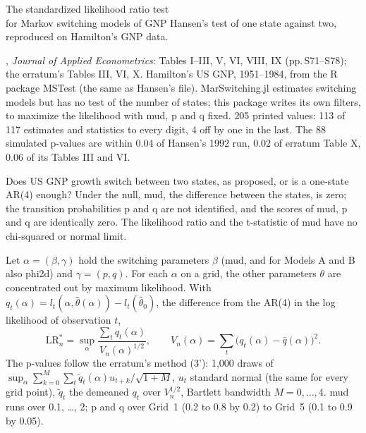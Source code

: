 
\renewcommand{\vignetteauthor}{Antonio Saragga Seabra}
\renewcommand{\vignettedate}{6 November 2026}
\renewcommand{\vignettelicense}{MIT}



  {The standardized likelihood ratio test\\ for Markov switching models of GNP}
  {Hansen's test of one state against two, reproduced on Hamilton's GNP data.}

\factsheet
  {, \emph{Journal of Applied Econometrics}: Tables I--III, V, VI, VIII, IX (pp.\,S71--S78); the  erratum's Tables III, VI, X. Hamilton's US GNP, 1951--1984, from the R package MSTest (the same as Hansen's file).}
  {MarSwitching.jl estimates switching models but has no test of the number of states; this package writes its own filters, to maximize the likelihood with mud, p and q fixed.}
  {}
  {205 printed values: 113 of 117 estimates and statistics to every digit, 4 off by one in the last. The 88 simulated p-values are within 0.04 of Hansen's 1992 run, 0.02 of erratum Table X, 0.06 of its Tables III and VI.}

Does US GNP growth switch between two states, as  proposed, or is a one-state AR(4) enough? Under the null, mud, the difference between the states, is zero; the transition probabilities p and q are not identified, and the scores of mud, p and q are identically zero. The likelihood ratio and the t-statistic of mud have no chi-squared or normal limit.

Let $\alpha=(\beta,\gamma)$ hold the switching parameters $\beta$ (mud, and for Models A and B also phi2d) and $\gamma=(p,q)$. For each $\alpha$ on a grid, the other parameters $\theta$ are concentrated out by maximum likelihood. With $q_t(\alpha)=l_t(\alpha,\hat\theta(\alpha))-l_t(\hat\theta_0)$, the difference from the AR(4) in the log likelihood of observation $t$,
\[
\mathrm{LR}^*_n=\sup_\alpha \frac{\sum_t q_t(\alpha)}{V_n(\alpha)^{1/2}},\qquad V_n(\alpha)=\sum_t\bigl(q_t(\alpha)-\bar q(\alpha)\bigr)^2 .
\]
The p-values follow the erratum's method (3'): 1,000 draws of $\sup_\alpha\sum_{k=0}^{M}\sum_t \tilde q_t(\alpha)u_{t+k}/\sqrt{1+M}$, $u_t$ standard normal (the same for every grid point), $\tilde q_t$ the demeaned $q_t$ over $V_n^{1/2}$, Bartlett bandwidth $M=0,\dots,4$. mud runs over 0.1, \dots, 2; p and q over Grid~1 (0.2 to 0.8 by 0.2) to Grid~5 (0.1 to 0.9 by 0.05).

